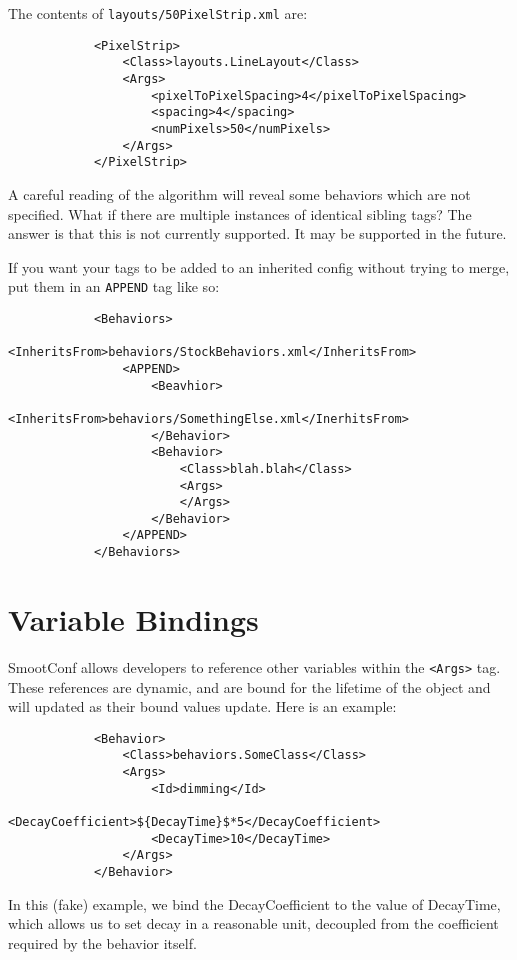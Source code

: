 \documentclass{article}
\begin{document}
        The contents of \texttt{layouts/50PixelStrip.xml} are:
        \begin{verbatim}
            <PixelStrip>
                <Class>layouts.LineLayout</Class>
                <Args>
                    <pixelToPixelSpacing>4</pixelToPixelSpacing>
                    <spacing>4</spacing> 
                    <numPixels>50</numPixels>
                </Args>
            </PixelStrip>
        \end{verbatim}

        A careful reading of the algorithm will reveal some behaviors which are not specified.  What if there are
        multiple instances of identical sibling tags?  The answer is that this is not currently
        supported.  It may be supported in the future.
        
        If you want your tags to be added to an inherited config without trying to merge, put them
        in an \texttt{APPEND} tag like so:

        \begin{verbatim}
            <Behaviors>
                <InheritsFrom>behaviors/StockBehaviors.xml</InheritsFrom>
                <APPEND>
                    <Beavhior>
                        <InheritsFrom>behaviors/SomethingElse.xml</InerhitsFrom>
                    </Behavior>
                    <Behavior>
                        <Class>blah.blah</Class>
                        <Args>
                        </Args>
                    </Behavior>
                </APPEND>
            </Behaviors>
        \end{verbatim}
    \section{Variable Bindings}
        SmootConf allows developers to reference other variables within the \texttt{<Args>} tag.  These
        references are dynamic, and are bound for the lifetime of the object and will updated as
        their bound values update.  Here is an example:
        \begin{verbatim}
            <Behavior>
                <Class>behaviors.SomeClass</Class>
                <Args>
                    <Id>dimming</Id>
                    <DecayCoefficient>${DecayTime}$*5</DecayCoefficient>
                    <DecayTime>10</DecayTime>
                </Args>
            </Behavior>
        \end{verbatim}
        In this (fake) example, we bind the DecayCoefficient to the value of DecayTime, which allows us to
        set decay in a reasonable unit, decoupled from the coefficient required by the behavior
        itself.
\end{document}
